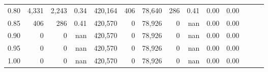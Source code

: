 \begin{tabular}{rrrrrrrrrrrrrr}
0.80 &   4,331 &   2,243 &  0.34 &  420,164 &      406 &  78,640 &     286 &  0.41 &  0.00 &      0.00 \\
0.85 &     406 &     286 &  0.41 &  420,570 &        0 &  78,926 &       0 &   nan &  0.00 &      0.00 \\
0.90 &       0 &       0 &   nan &  420,570 &        0 &  78,926 &       0 &   nan &  0.00 &      0.00 \\
0.95 &       0 &       0 &   nan &  420,570 &        0 &  78,926 &       0 &   nan &  0.00 &      0.00 \\
1.00 &       0 &       0 &   nan &  420,570 &        0 &  78,926 &       0 &   nan &  0.00 &      0.00 \\
\bottomrule
\end{tabular}
